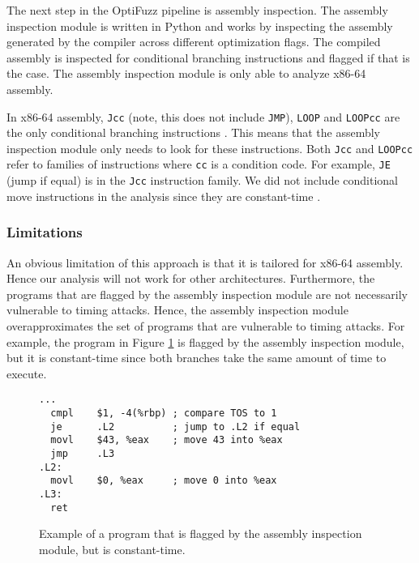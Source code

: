 \label{sec:inspection}

The next step in the OptiFuzz pipeline is assembly inspection.
The assembly inspection module is written in Python and works by inspecting the assembly generated by the compiler across different optimization flags.
The compiled assembly is inspected for conditional branching instructions and flagged if that is the case.
The assembly inspection module is only able to analyze x86-64 assembly.

In x86-64 assembly, \texttt{Jcc} (note, this does not include \texttt{JMP}), \texttt{LOOP} and \texttt{LOOPcc} are the only conditional branching instructions \citep{intel-reference}.
This means that the assembly inspection module only needs to look for these instructions.
Both \texttt{Jcc} and \texttt{LOOPcc} refer to families of instructions where \texttt{cc} is a condition code.
For example, \texttt{JE} (jump if equal) is in the \texttt{Jcc} instruction family. 
We did not include conditional move instructions in the analysis since they are constant-time \citep{cmov-is-constant-time}.

\subsubsection{Limitations}
An obvious limitation of this approach is that it is tailored for x86-64 assembly.
Hence our analysis will not work for other architectures.
Furthermore, the programs that are flagged by the assembly inspection module are not necessarily vulnerable to timing attacks.
Hence, the assembly inspection module overapproximates the set of programs that are vulnerable to timing attacks.
For example, the program in Figure \ref{fig:assembly-inspection-example} is flagged by the assembly inspection module, but it is constant-time since both branches take the same amount of time to execute.

\begin{figure}[]
  \centering
  \begin{lstlisting}[style=defstyle, language={[x86masm]Assembler}, basicstyle=\footnotesize\ttfamily,breaklines=true, xleftmargin=4cm, xrightmargin=4cm]
...
  cmpl    $1, -4(%rbp) ; compare TOS to 1
  je      .L2          ; jump to .L2 if equal
  movl    $43, %eax    ; move 43 into %eax
  jmp     .L3
.L2:
  movl    $0, %eax     ; move 0 into %eax
.L3:
  ret\end{lstlisting}
  \caption{Example of a program that is flagged by the assembly inspection module, but is constant-time.}
  \label{fig:assembly-inspection-example}
\end{figure}